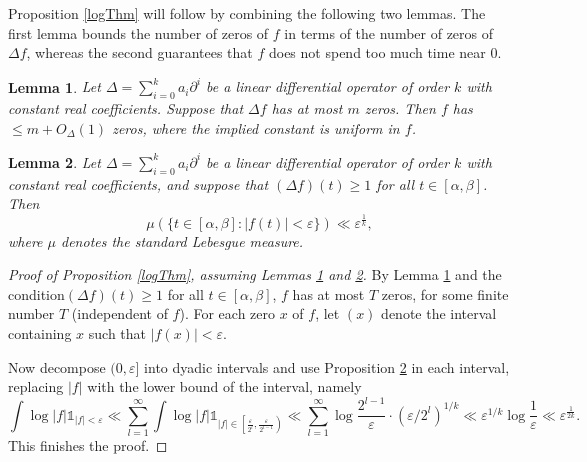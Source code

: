 \documentclass[12pt, a4paper]{amsart}
\newtheorem{lemma}{Lemma}
\theoremstyle{remark}
\begin{document}
Proposition \ref{logThm} will follow by combining the following two lemmas. The first lemma bounds the number of zeros of $f$ in terms of the number of zeros of $\Delta f$, whereas the second guarantees that $f$ does not spend too much time near $0$. 

\begin{lemma}\label{prop1}
    Let $\Delta = \sum_{i=0}^k a_i \partial^i$ be a linear differential operator of order $k$ with constant real coefficients. Suppose that $\Delta f$ has at most $m$ zeros. Then $f$ has $\leq m + O_{\Delta}(1)$ zeros, where the implied constant is uniform in $f$.
\end{lemma}

\begin{lemma}\label{prop2}
    Let $\Delta = \sum_{i=0}^k a_i \partial^i$ be a linear differential operator of order $k$ with constant real coefficients, and suppose that $(\Delta f)(t)\geq 1$ for all $t\in [\alpha, \beta]$. Then 
    \begin{equation}\nonumber
        \mu\left(\{t\in[\alpha, \beta] : \lvert f(t)\rvert<\varepsilon \} \right)\ll \varepsilon^{\frac{1}{k}},
    \end{equation}
    where $\mu$ denotes the standard Lebesgue measure. 
\end{lemma}

\begin{proof}[Proof of Proposition \ref{logThm}, assuming Lemmas \ref{prop1} and \ref{prop2}]
    By Lemma \ref{prop1} and the condition\linebreak $(\Delta f)(t)\geq 1$ for all $t\in [\alpha, \beta]$, $f$ has at most $T$ zeros, for some finite number $T$ (independent of $f$). For each zero $x$ of $f$, let $(x)$ denote the interval containing $x$ such that $\lvert f(x)\rvert<\varepsilon$. 

Now decompose $(0, \varepsilon]$ into dyadic intervals and use Proposition \ref{prop2} in each interval, replacing $\lvert f\rvert$ with the lower bound of the interval, namely 
    \begin{equation}\nonumber
        \int\log\lvert f\rvert\mathds1_{\lvert f\rvert<\varepsilon}\ll \sum_{l=1}^\infty \int\log\lvert f\rvert\mathds1_{\lvert f\rvert\in\left[\frac{\varepsilon}{2^l}, \frac{\varepsilon}{2^{l-1}}\right)}\ll \sum_{l=1}^\infty \log \frac{2^{l-1}}{\varepsilon
        }\cdot(\varepsilon/2^{l})^{1/k}\ll \varepsilon^{1/k}\log\frac{1}{\varepsilon}\ll \varepsilon^{\frac{1}{2k}}.
    \end{equation}
This finishes the proof. \end{proof}
\end{document}
